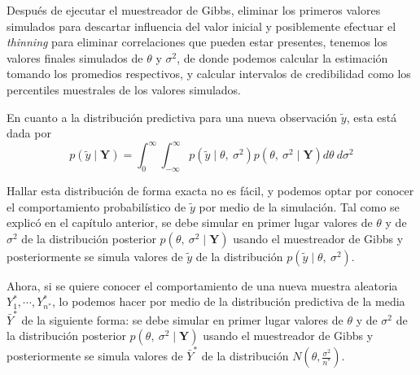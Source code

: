 Después de ejecutar el muestreador de Gibbs, eliminar los primeros valores simulados para descartar influencia del valor inicial y posiblemente efectuar el \emph{thinning} para eliminar correlaciones que pueden estar presentes, tenemos los valores finales simulados de $\theta$ y $\sigma^2$, de donde podemos calcular la estimación tomando los promedios respectivos, y calcular intervalos de credibilidad como los percentiles muestrales de los valores simulados. 

En cuanto a la distribución predictiva para una nueva observación $\tilde{y}$, esta está dada por
\begin{equation*}
p(\tilde{y}\mid\mathbf{Y})=\int_0^\infty\int_{-\infty}^\infty p(\tilde{y}\mid\theta,\ \sigma^2)p(\theta,\ \sigma^2\mid\mathbf{Y})d\theta\ d\sigma^2
\end{equation*}

Hallar esta distribución de forma exacta no es fácil, y podemos optar por conocer el comportamiento probabilístico de $\tilde{y}$ por medio de la simulación. Tal como se explicó en el capítulo anterior, se debe simular en primer lugar valores de $\theta$ y de $\sigma^2$ de la distribución posterior $p(\theta,\ \sigma^2\mid\mathbf{Y})$ usando el muestreador de Gibbs y posteriormente se simula valores de $\tilde{y}$ de la distribución $p(\tilde{y}\mid\theta,\ \sigma^2)$. 

Ahora, si se quiere conocer el comportamiento de una nueva muestra aleatoria $Y_1^{*},\cdots,Y_{n^*}^{*}$, lo podemos hacer por medio de la distribución predictiva de la media $\bar{Y}^*$ de la siguiente forma: se debe simular en primer lugar valores de $\theta$ y de $\sigma^2$ de la distribución posterior $p(\theta,\ \sigma^2\mid\mathbf{Y})$ usando el muestreador de Gibbs y posteriormente se simula valores de $\bar{Y}^*$ de la distribución $N(\theta,\frac{\sigma^2}{n^*})$.

